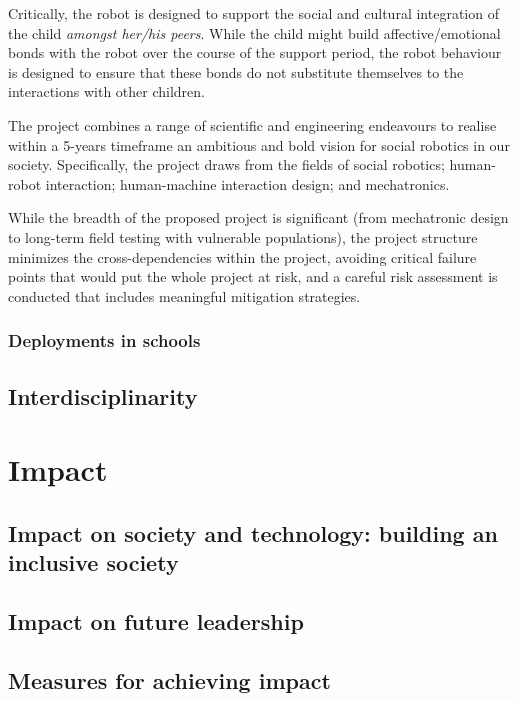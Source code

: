 \documentclass[]{article}
\begin{document}
Critically, the robot is designed to support the social and cultural
integration of the child \emph{amongst her/his peers}. While the child
might build affective/emotional bonds with the robot over the course of
the support period, the robot behaviour is designed to ensure that these
bonds do not substitute themselves to the interactions with other
children.

The project combines a range of scientific and engineering endeavours to
realise within a 5-years timeframe an ambitious and bold vision for
social robotics in our society. Specifically, the project draws from the
fields of social robotics; human-robot interaction; human-machine
interaction design; and mechatronics.

While the breadth of the proposed project is significant (from
mechatronic design to long-term field testing with vulnerable
populations), the project structure minimizes the cross-dependencies
within the project, avoiding critical failure points that would put the
whole project at risk, and a careful risk assessment is conducted that
includes meaningful mitigation strategies.

\subsubsection{Deployments in schools}\label{deployments-in-schools}

\subsection{Interdisciplinarity}\label{interdisciplinarity}

\section{Impact}\label{impact}

\subsection{Impact on society and technology: building an inclusive
society}\label{impact-on-society-and-technology-building-an-inclusive-society}

\subsection{Impact on future leadership}\label{impact-on-future-leadership}

\subsection{Measures for achieving impact}\label{measures-for-achieving-impact}
\end{document}
